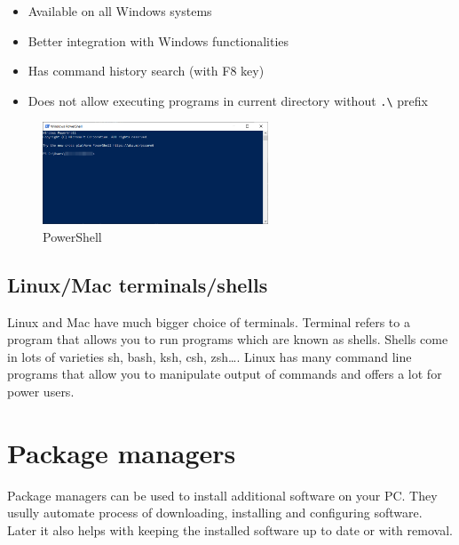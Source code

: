 \documentclass[lang=en,color=green]{elegantbook}
\begin{document}
\noindent\begin{minipage}[t]{0.5\textwidth}%
    \begin{itemize}[leftmargin=*]
        \item Available on all Windows systems
        \item Better integration with Windows functionalities
        \item Has command history search (with F8 key)
    \end{itemize}
\end{minipage}%
\begin{minipage}[t]{0.5\textwidth}%
    \begin{itemize}[leftmargin=*]
        \item  Does not allow executing programs in
              current directory without  \lstinline{.\} prefix
    \end{itemize}
\end{minipage}%

\begin{figure}[htbp]
    \centering
    \includegraphics[width=0.6\textwidth]{images/powershell.png}
    \caption{PowerShell\label{fig:PowerShell}}
\end{figure}

\subsection{Linux/Mac terminals/shells}

Linux and Mac have much bigger choice of terminals. Terminal refers to a program that allows you to run
programs which are known as shells. Shells come in lots of varieties sh, bash, ksh, csh, zsh\dots.
Linux has many command line programs that allow you to manipulate output of commands and
offers a lot for power users.


\section{Package managers}

Package managers can be used to install additional software on your PC. They usully automate process of
downloading, installing and configuring software. Later it also helps with keeping the installed software
up to date or with removal.
\end{document}
